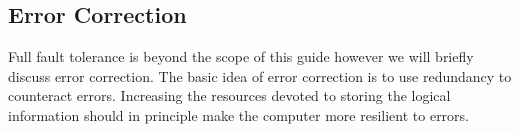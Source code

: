 \subsection{Error Correction}

Full fault tolerance is beyond the scope of this guide however we will briefly discuss error correction. The basic idea of error correction is to use redundancy to counteract errors. Increasing the resources devoted to storing the logical information should in principle make the computer more resilient to errors.


